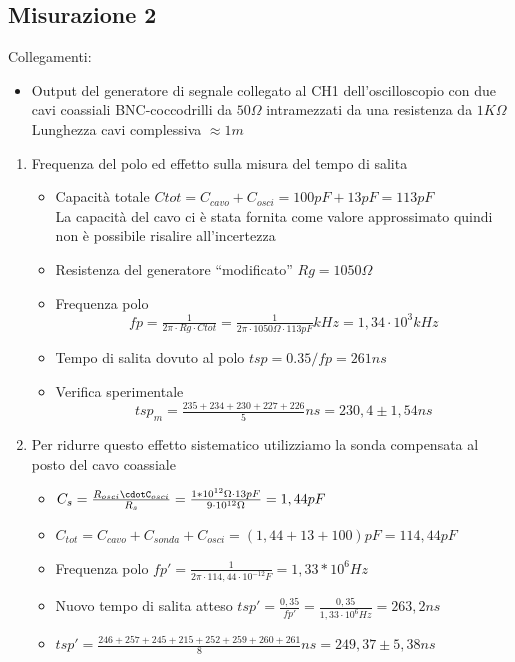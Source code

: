\documentclass[a4paper]{article}
\begin{document}
\subsection{Misurazione 2}

Collegamenti:
\begin{itemize}
\item Output del generatore di segnale collegato al CH1 dell'oscilloscopio con due cavi coassiali BNC-coccodrilli da \(50 \Omega\) intramezzati da una resistenza da \(1 K\Omega\) \\
Lunghezza cavi complessiva \(\approx 1 m\) 
\end{itemize}


\begin{enumerate}
\item Frequenza del polo ed effetto sulla misura del tempo di salita
  \begin{itemize}
    \item Capacità totale \(Ctot = C_{cavo} + C_{osci} = 100 pF + 13 pF = 113 pF\) \\ La capacità del cavo ci è stata fornita come valore approssimato quindi non è possibile risalire all'incertezza
    \item Resistenza del generatore ``modificato'' \(Rg= 1050 \Omega\)
    \item Frequenza polo \[fp = \tfrac{1}{2\pi \cdot Rg \cdot Ctot} = \tfrac{1}{2\pi \cdot 1050\Omega \cdot 113pF}kHz = 1,34\cdot10^3 kHz \]
    \item Tempo di salita dovuto al polo \(tsp= 0.35/fp = 261 ns\)
    \item Verifica sperimentale \[tsp_m = \tfrac{235+234+230+227+226}{5} ns = 230,4 \pm 1,54 ns\]
    \end{itemize}

\item Per ridurre questo effetto sistematico utilizziamo la sonda compensata al posto del cavo coassiale
 \begin{itemize}
 \item  \(C_s=\tfrac{R_{osci}\cdotC_{osci}}{R_s}= \tfrac{1*10^{12}\Omega\cdot13 pF}{9\cdot10^{12}\Omega} = 1,44 pF\)
 \item \(C_{tot}= C_{cavo}+C_{sonda}+C_{osci} = (1,44 +13 +100)pF = 114,44 pF\)
 \item Frequenza polo \(fp' = \tfrac{1}{2\pi\cdot114,44\cdot10^{-12}F} = 1,33 * 10^6 Hz\)
 \item Nuovo tempo di salita atteso \(tsp'= \tfrac{0,35}{fp'} = \tfrac{0,35}{1,33\cdot10^6 Hz}= 263,2 ns\)
 \item \(tsp'= \tfrac{246+257+245+215+252+259+260+261}{8}ns = 249,37 \pm 5,38 ns\)
 \end{itemize}
\end{enumerate}
\end{document}
